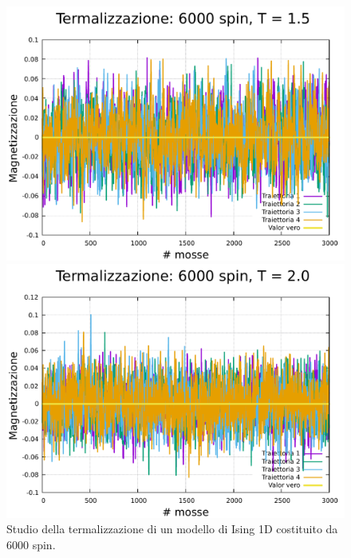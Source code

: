 \begin{figure}[htbp]
    \begin{minipage}{0.45\textwidth}  
      \centering
      \includegraphics[page=1, width=\textwidth]{Immagini/simIsing1D/magn0.0/term/term_6000_1.5.pdf}
      \caption{$T\,=\,1.5$}
    \end{minipage}\hfill
    \begin{minipage}{0.45\textwidth}  
      \centering
      \includegraphics[page=1, width=\textwidth]{Immagini/simIsing1D/magn0.0/term/term_6000_2.0.pdf}
      \caption{$T\,=\,2.0$}
    \end{minipage}
    \caption{Studio della termalizzazione di un modello di Ising 1D costituito da 6000 spin.}
\end{figure}

